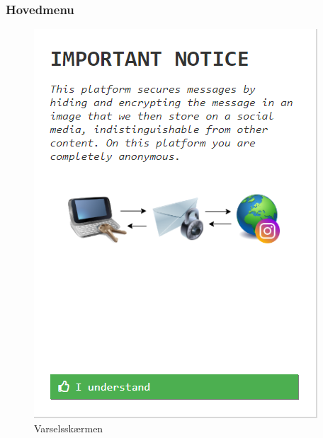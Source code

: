 \subsubsection{Hovedmenu}
\begin{table}[H]
    \begin{minipage}{.5\textwidth}
        \begin{figure}[H]
            \centering
            \includegraphics[width=0.90\linewidth]{Projectdoc/Assets/Illustrationer/splash.png}
            \caption{Varselsskærmen}
            \label{fig:splash}
        \end{figure}
    \end{minipage}
    \begin{minipage}{.5\textwidth}
        \begin{figure}[H]
            \centering

\end{figure}
\end{minipage}
\end{table}
